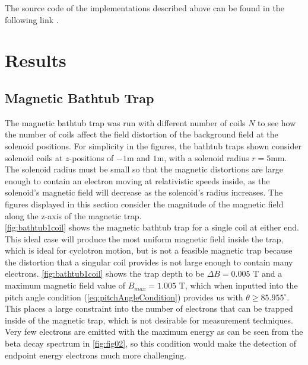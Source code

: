 \documentclass[a4paper,12pt, notitlepage]{article}
\begin{document}
The source code of the implementations described above can be found in the following link \cite{githublink}.
\section{Results}
\subsection{Magnetic Bathtub Trap}
The magnetic bathtub trap was run with different number of coils $N$ to see how the number of coils affect the field distortion of the background field at the solenoid positions. For simplicity in the figures, the bathtub traps shown consider solenoid coils at $z$-positions of $-1\textrm{m}$ and $1\textrm{m}$, with a solenoid radius $r=5\textrm{mm}$. The solenoid radius must be small so that the magnetic distortions are large enough to contain an electron moving at relativistic speeds inside, as the solenoid's magnetic field will decrease as the solenoid's radius increases. The figures displayed in this section consider the magnitude of the magnetic field along the z-axis of the magnetic trap. \\
\cref{fig:bathtub1coil} shows the magnetic bathtub trap for a single coil at either end. This ideal case will produce the most uniform magnetic field inside the trap, which is ideal for cyclotron motion, but is not a feasible magnetic trap because the distortion that a singular coil provides is not large enough to contain many electrons. \cref{fig:bathtub1coil} shows the trap depth to be $\Delta B=0.005$ T and a maximum magnetic field value of $B_{max}=1.005$ T, which when inputted into the pitch angle condition (\cref{eq:pitchAngleCondition}) provides us with $\theta \geq 85.955^{\circ}$. This places a large constraint into the number of electrons that can be trapped inside of the magnetic trap, which is not desirable for measurement techniques. Very few electrons are emitted with the maximum energy as can be seen from the beta decay spectrum in \cref{fig:fig02}, so this condition would make the detection of endpoint energy electrons much more challenging.
\end{document}
